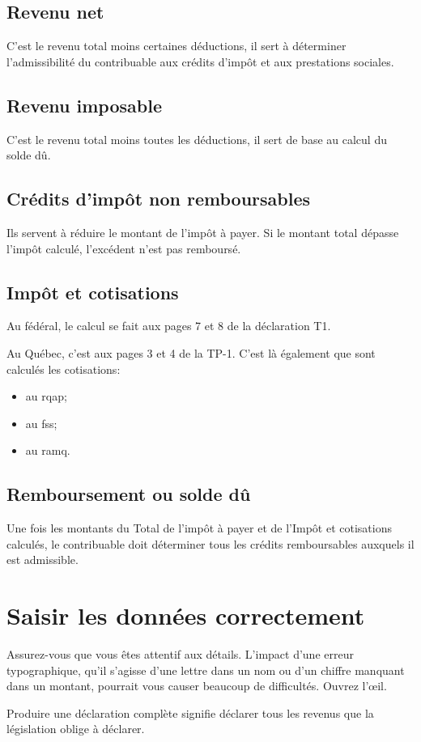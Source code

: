 \subsection{Revenu net}
C'est le revenu total moins certaines déductions, il sert à déterminer l'admissibilité du contribuable aux crédits d'impôt et aux prestations sociales.


\subsection{Revenu imposable}
C'est le revenu total moins toutes les déductions, il sert de base au calcul du solde dû.


\subsection{Crédits d'impôt non remboursables}
Ils servent à réduire le montant de l'impôt à payer. Si le montant total dépasse l'impôt calculé, l'excédent n'est pas remboursé.


\subsection{Impôt et cotisations}
Au fédéral, le calcul se fait aux pages 7 et 8 de la déclaration T1.

Au Québec, c'est aux pages 3 et 4 de la TP-1. C'est là également que sont calculés les cotisations:
\begin{itemize}
	\item au \acrfull{rqap};
	\item au \acrfull{fss};
	\item au \acrfull{ramq}.
\end{itemize}


\subsection{Remboursement ou solde dû}
Une fois les montants du \og Total de l'impôt à payer\fg{} \cat{} et de l'\og Impôt et cotisations \fg{}~\qct{} calculés, le contribuable doit déterminer tous les crédits remboursables auxquels il est admissible.



\section{Saisir les données correctement}
\begin{intro}
	Assurez-vous que vous êtes attentif aux détails. L'impact d'une erreur typographique, qu'il s'agisse d'une lettre dans un nom ou d'un chiffre manquant dans un montant, pourrait vous causer beaucoup de difficultés. Ouvrez l'œil.
\end{intro}
Produire une \og déclaration complète\fg{} signifie déclarer tous les revenus que la législation oblige à déclarer.

